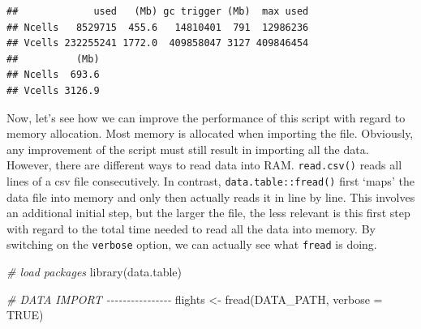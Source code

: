\documentclass[
  12pt,
]{style/krantz}
\newenvironment{Shaded}{\begin{snugshade}}{\end{snugshade}}
\newcommand{\AttributeTok}[1]{\textcolor[rgb]{0.77,0.63,0.00}{#1}}
\newcommand{\CommentTok}[1]{\textcolor[rgb]{0.56,0.35,0.01}{\textit{#1}}}
\newcommand{\ConstantTok}[1]{\textcolor[rgb]{0.00,0.00,0.00}{#1}}
\newcommand{\FunctionTok}[1]{\textcolor[rgb]{0.00,0.00,0.00}{#1}}
\newcommand{\NormalTok}[1]{#1}
\newcommand{\OtherTok}[1]{\textcolor[rgb]{0.56,0.35,0.01}{#1}}
\begin{document}
\begin{verbatim}
##             used   (Mb) gc trigger (Mb)  max used
## Ncells   8529715  455.6   14810401  791  12986236
## Vcells 232255241 1772.0  409858047 3127 409846454
##          (Mb)
## Ncells  693.6
## Vcells 3126.9
\end{verbatim}

Now, let's see how we can improve the performance of this script with regard to memory allocation. Most memory is allocated when importing the file. Obviously, any improvement of the script must still result in importing all the data. However, there are different ways to read data into RAM. \texttt{read.csv()} reads all lines of a csv file consecutively. In contrast, \texttt{data.table::fread()} first `maps' the data file into memory and only then actually reads it in line by line. This involves an additional initial step, but the larger the file, the less relevant is this first step with regard to the total time needed to read all the data into memory. By switching on the \texttt{verbose} option, we can actually see what \texttt{fread} is doing.

\begin{Shaded}
\begin{Highlighting}[]
\CommentTok{\# load packages}
\FunctionTok{library}\NormalTok{(data.table)}

\CommentTok{\# DATA IMPORT {-}{-}{-}{-}{-}{-}{-}{-}{-}{-}{-}{-}{-}{-}{-}{-}}
\NormalTok{flights }\OtherTok{\textless{}{-}} \FunctionTok{fread}\NormalTok{(DATA\_PATH, }\AttributeTok{verbose =} \ConstantTok{TRUE}\NormalTok{)}
\end{Highlighting}
\end{Shaded}
\end{document}
